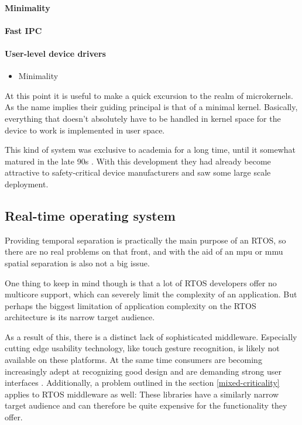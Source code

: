\paragraph{Minimality}
\paragraph{Fast IPC}
\paragraph{User-level device drivers}

\begin{itemize}
    \item Minimality
\end{itemize}

At this point it is useful to make a quick excursion to the realm of microkernels. As the name implies their guiding principal is that of a minimal kernel. Basically, everything that doesn't absolutely have to be handled in kernel space for the device to work is implemented in user space.

This kind of system was exclusive to academia for a long time, until it somewhat matured in the late 90s \cite{Liedtke.1995}\cite{Liedtke.1996}. With this development they had already become attractive to safety-critical device manufacturers and saw some large scale deployment.

\subsection{Real-time operating system}
Providing temporal separation is practically the main purpose of an RTOS, so there are no real problems on that front, and with the aid of an \acrshort{mpu} or \acrshort{mmu} spatial separation is also not a big issue.

One thing to keep in mind though is that a lot of RTOS developers offer no multicore support, which can severely limit the complexity of an application. But perhaps the biggest limitation of application complexity on the RTOS architecture is its narrow target audience.

As a result of this, there is a distinct lack of sophisticated middleware. Especially cutting edge usability technology, like touch gesture recognition, is likely not available on these platforms. At the same time consumers are becoming increasingly adept at recognizing good design and are demanding strong user interfaces \cite{HBR.September2015}.
Additionally, a problem outlined in the section \ref{mixed-criticality} applies to RTOS middleware as well: These libraries have a similarly narrow target audience and can therefore be quite expensive for the functionality they offer.

